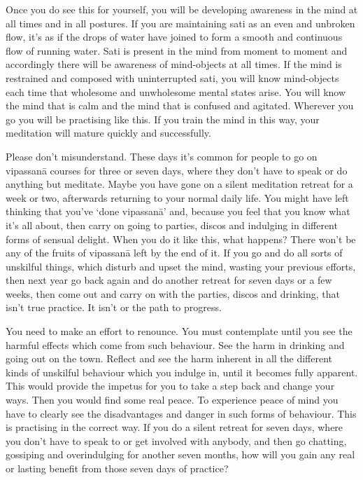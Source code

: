 Once you do see this for yourself, you will be developing awareness in the mind at all times and in all postures. If you are maintaining sati as an even and unbroken flow, it's as if the drops of water have joined to form a smooth and continuous flow of running water. Sati is present in the mind from moment to moment and accordingly there will be awareness of mind-objects at all times. If the mind is restrained and composed with uninterrupted sati, you will know mind-objects each time that wholesome and unwholesome mental states arise. You will know the mind that is calm and the mind that is confused and agitated. Wherever you go you will be practising like this. If you train the mind in this way, your meditation will mature quickly and successfully.

Please don't misunderstand. These days it's common for people to go on vipassan\=a courses for three or seven days, where they don't have to speak or do anything but meditate. Maybe you have gone on a silent meditation retreat for a week or two, afterwards returning to your normal daily life. You might have left thinking that you've `done vipassan\=a' and, because you feel that you know what it's all about, then carry on going to parties, discos and indulging in different forms of sensual delight. When you do it like this, what happens? There won't be any of the fruits of vipassan\=a left by the end of it. If you go and do all sorts of unskilful things, which disturb and upset the mind, wasting your previous efforts, then next year go back again and do another retreat for seven days or a few weeks, then come out and carry on with the parties, discos and drinking, that isn't true practice. It isn't  or the path to progress.

You need to make an effort to renounce. You must contemplate until you see the harmful effects which come from such behaviour. See the harm in drinking and going out on the town. Reflect and see the harm inherent in all the different kinds of unskilful behaviour which you indulge in, until it becomes fully apparent. This would provide the impetus for you to take a step back and change your ways. Then you would find some real peace. To experience peace of mind you have to clearly see the disadvantages and danger in such forms of behaviour. This is practising in the correct way. If you do a silent retreat for seven days, where you don't have to speak to or get involved with anybody, and then go chatting, gossiping and overindulging for another seven months, how will you gain any real or lasting benefit from those seven days of practice?

